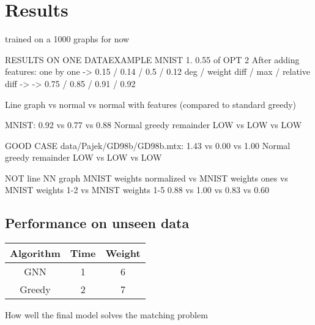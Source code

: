 \chapter{Results}

trained on a 1000 graphs for now

RESULTS ON ONE DATAEXAMPLE MNIST
1. 0.55 of OPT
2 After adding features:
  one by one
  -> 0.15 / 0.14 / 0.5 / 0.12
  deg / weight diff / max / relative diff ->
  -> 0.75 / 0.85 / 0.91 / 0.92


Line graph vs normal vs normal with features (compared to standard greedy)

MNIST:
0.92 vs  0.77 vs  0.88 
Normal greedy remainder
LOW vs LOW vs LOW 

GOOD CASE data/Pajek/GD98b/GD98b.mtx:
1.43 vs  0.00 vs 1.00
Normal greedy remainder
LOW vs LOW vs LOW



NOT line NN graph MNIST weights normalized vs MNIST weights ones vs MNIST weights 1-2 vs MNIST weights 1-5
0.88 vs 1.00  vs 0.83 vs 0.60

\section{Performance on unseen data}

\begin{center}
\begin{tabular}{||c c c||} 
 \hline
 Algorithm & Time & Weight \\ [0.5ex] 
 \hline\hline
 GNN & 1 & 6 \\ 
 \hline
 Greedy & 2 & 7 \\ [1ex] 
 \hline
\end{tabular}
\end{center}

How well the final model solves the matching problem